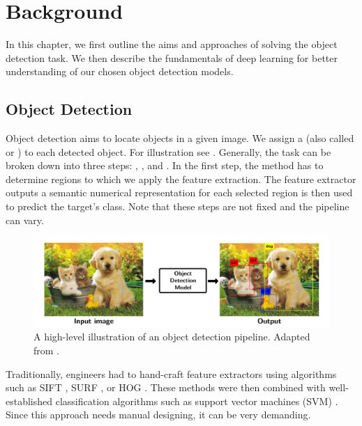 \chapter{Background}
In this chapter, we first outline the aims and approaches of solving the object
detection task. We then describe the fundamentals of deep learning for better
understanding of our chosen object detection models.

\section{Object Detection}
Object detection aims to locate objects in a given image. We assign a
 (also called  or ) to each detected object.
For illustration see . Generally, the task can be broken
down into three steps: ,
, and . In the first step, the
method has to determine regions to which we apply the feature extraction. The
feature extractor outputs a semantic numerical representation for each selected
region is then used to predict the target's class. Note that these steps are
not fixed and the pipeline can vary.

\begin{figure}[h]
    \centering
    \includegraphics[width=0.9\linewidth]{Sources/Figures/objectdetection.png}
    \caption{A high-level illustration of an object detection pipeline. Adapted
        from \cite{objectdetectionfigure}.}
    \label{fig:od}
\end{figure}

Traditionally, engineers had to hand-craft feature extractors using algorithms
such as SIFT \cite{sift}, SURF \cite{surf}, or HOG \cite{hog}. These methods were
then combined with well-established classification algorithms such as support
vector machines (SVM) \cite{svm}. Since this approach needs manual designing, it
can be very demanding.

